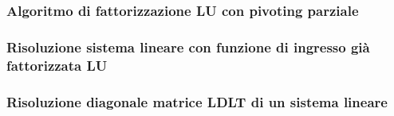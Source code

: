 \subsubsection{Algoritmo di fattorizzazione LU con pivoting parziale}

\subsubsection{Risoluzione sistema lineare con funzione di ingresso già fattorizzata LU}


\subsubsection{Risoluzione diagonale matrice LDLT di un sistema lineare}
